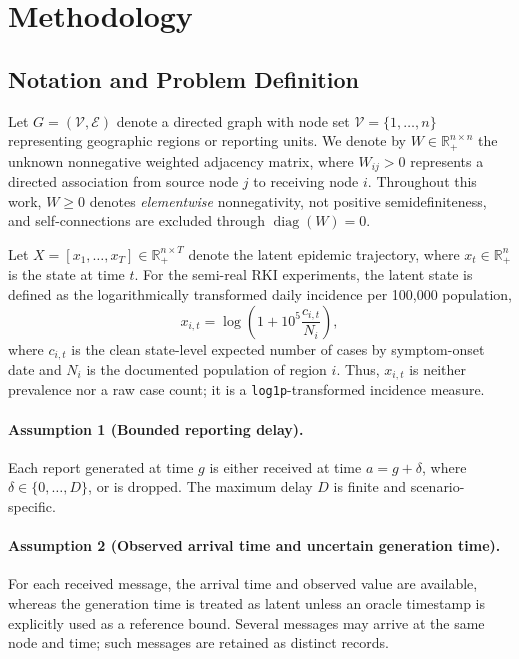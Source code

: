\section{Methodology}
\label{sec:methodology}

\subsection{Notation and Problem Definition}
\label{subsec:notation}
Let $G=(\mathcal{V},\mathcal{E})$ denote a directed graph with node set $\mathcal{V}=\{1,\ldots,n\}$ representing geographic regions or reporting units. We denote by $W\in\mathbb{R}_{+}^{n\times n}$ the unknown nonnegative weighted adjacency matrix, where $W_{ij}>0$ represents a directed association from source node $j$ to receiving node $i$. Throughout this work, $W\geq 0$ denotes \emph{elementwise} nonnegativity, not positive semidefiniteness, and self-connections are excluded through $\operatorname{diag}(W)=0$.

Let $X=[x_1,\ldots,x_T]\in\mathbb{R}_{+}^{n\times T}$ denote the latent epidemic trajectory, where $x_t\in\mathbb{R}_{+}^{n}$ is the state at time $t$. For the semi-real RKI experiments, the latent state is defined as the logarithmically transformed daily incidence per 100,000 population,
\begin{equation}
    x_{i,t}
    =\log\!\left(1+10^{5}\frac{c_{i,t}}{N_i}\right),
    \label{eq:latent_state_new}
\end{equation}
where $c_{i,t}$ is the clean state-level expected number of cases by symptom-onset date and $N_i$ is the documented population of region $i$. Thus, $x_{i,t}$ is neither prevalence nor a raw case count; it is a \texttt{log1p}-transformed incidence measure.

\paragraph{Assumption 1 (Bounded reporting delay).}
Each report generated at time $g$ is either received at time $a=g+\delta$, where $\delta\in\{0,\ldots,D\}$, or is dropped. The maximum delay $D$ is finite and scenario-specific.

\paragraph{Assumption 2 (Observed arrival time and uncertain generation time).}
For each received message, the arrival time and observed value are available, whereas the generation time is treated as latent unless an oracle timestamp is explicitly used as a reference bound. Several messages may arrive at the same node and time; such messages are retained as distinct records.

